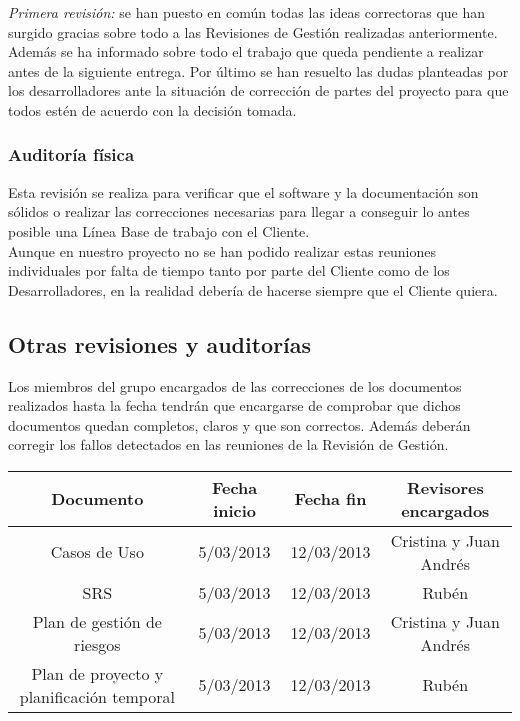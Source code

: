 \documentclass[11pt, a4paper, twoside, titlepage]{article}
\begin{document}
			\textit{Primera revisión:} se han puesto en común todas las ideas correctoras que han surgido gracias sobre todo a las Revisiones de Gestión realizadas anteriormente. Además se ha informado sobre todo el trabajo que queda pendiente a realizar antes de la siguiente entrega. Por último se han resuelto las dudas planteadas por los desarrolladores ante la situación de corrección de partes del proyecto para que todos estén de acuerdo con la decisión tomada. %

		\subsubsection{Auditoría física}
			Esta revisión se realiza para verificar que el software y la documentación son sólidos o realizar las correcciones necesarias para llegar a conseguir lo antes posible una Línea Base de trabajo con el Cliente.\\
		Aunque en nuestro proyecto no se han podido realizar estas reuniones individuales por falta de tiempo tanto por parte del Cliente como de los Desarrolladores, en la realidad debería de hacerse siempre que el Cliente quiera.
		
		\subsection{Otras revisiones y auditorías}
			Los miembros del grupo encargados de las correcciones de los documentos realizados hasta la fecha tendrán que encargarse 	de comprobar que dichos documentos quedan completos, claros y que son correctos. Además deberán corregir los fallos detectados en las reuniones de la Revisión de Gestión. \\
		
			\begin{center}
			\begin{tabular}{| c | c | c | c |}
				\hline
				\bfseries Documento 	& \bfseries Fecha inicio & \bfseries Fecha fin & \bfseries Revisores encargados	\\ \hline
				Casos de Uso		& 5/03/2013	& 12/03/2013	& Cristina y Juan Andrés	\\ \hline
				SRS 			& 5/03/2013 	& 12/03/2013 	& Rubén				\\ \hline
				Plan de gestión de riesgos & 5/03/2013	& 12/03/2013 	& Cristina y Juan Andrés	\\ \hline
				Plan de proyecto y planificación temporal & 5/03/2013 	& 12/03/2013 & Rubén		\\ \hline
			\end{tabular}
			\end{center}
		
\end{document}
